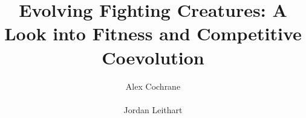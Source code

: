 \documentclass{acm_proc_article-sp}
\begin{document}
\title{Evolving Fighting Creatures: A Look into Fitness and Competitive Coevolution}
%
%
%
%
%

%
\author{
%
%
\alignauthor
Alex Cochrane\\
       \\
\alignauthor
Jordan Leithart\\
       \\
}

\end{document}
